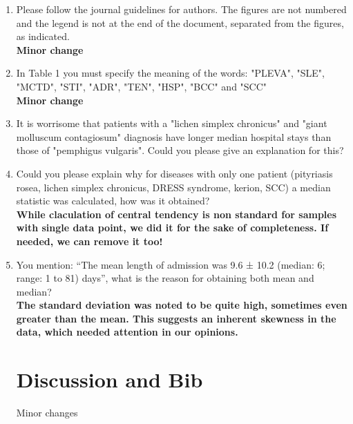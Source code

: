 \documentclass[a4paper]{article}
\begin{document}
\begin{enumerate}
\begin{figure}[H]
\begin{center}
        \end{center}
    \end{figure}
    \item Please follow the journal guidelines for authors. The figures are not numbered and the legend is not at the end of the document, separated from the figures, as indicated.\\
    \textbf{Minor change}
    \item  In Table 1 you must specify the meaning of the words: "PLEVA", "SLE", "MCTD", "STI", "ADR", "TEN", "HSP", "BCC" and "SCC"\\
    \textbf{Minor change}
    \item  It is worrisome that patients with a "lichen simplex chronicus" and "giant molluscum contagiosum" diagnosis have longer median hospital stays than those of "pemphigus vulgaris". Could you please give an explanation for this?
    \item Could you please explain why for diseases with only one patient (pityriasis rosea, lichen simplex chronicus, DRESS syndrome, kerion, SCC) a median statistic was calculated, how was it obtained? \\
    \textbf{While claculation of central tendency is non standard for samples with single data point, we did it for the sake of completeness. If needed, we can remove it too!}
    \item You mention: “The mean length of admission was 9.6 ± 10.2 (median: 6; range: 1 to 81) days”, what is the reason for obtaining both mean and median?\\
    \textbf{The standard deviation was noted to be quite high, sometimes even greater than the mean. This suggests an inherent skewness in the data, which needed attention in our opinions.}

\section{Discussion and Bib}

Minor changes


\end{enumerate}
\end{document}
